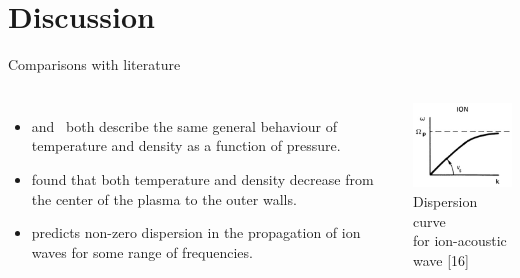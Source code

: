 \documentclass[10pt]{beamer}
\begin{document}
\section{Discussion}
\begin{frame}{Comparisons with literature}
    \begin{columns}
        \begin{itemize}
            \itemsep8pt
            \item {} and \,  both describe the same general behaviour of temperature and density as a function of pressure.
            \item {} found that both temperature and density decrease from the center of the plasma to the outer walls.
            \item {} predicts non-zero dispersion in the propagation of ion waves for some range of frequencies.
        \end{itemize}

        \includegraphics[width=4.5cm]{../figures/chen-dispersion.png} \\
        \centering
        \small Dispersion curve \\ for ion-acoustic wave [16]
    \end{columns}
\end{frame}


\end{document}
